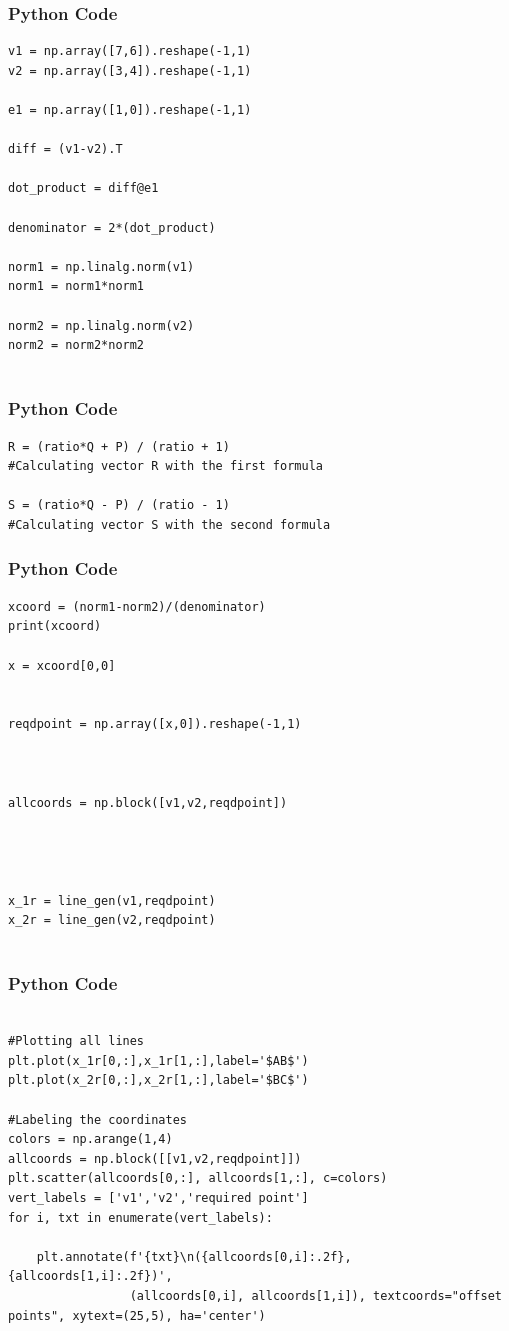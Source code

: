 \documentclass{beamer}
\begin{document}
\begin{frame}[fragile]
    \frametitle{Python Code}

    \begin{lstlisting}
v1 = np.array([7,6]).reshape(-1,1)
v2 = np.array([3,4]).reshape(-1,1)

e1 = np.array([1,0]).reshape(-1,1)

diff = (v1-v2).T

dot_product = diff@e1

denominator = 2*(dot_product)

norm1 = np.linalg.norm(v1)
norm1 = norm1*norm1

norm2 = np.linalg.norm(v2)
norm2 = norm2*norm2


    \end{lstlisting}
\end{frame}

\begin{frame}[fragile]
    \frametitle{Python Code}

    \begin{lstlisting}
R = (ratio*Q + P) / (ratio + 1)
#Calculating vector R with the first formula

S = (ratio*Q - P) / (ratio - 1)
#Calculating vector S with the second formula

    \end{lstlisting}
\end{frame}

\begin{frame}[fragile]
    \frametitle{Python Code}

    \begin{lstlisting}
xcoord = (norm1-norm2)/(denominator)
print(xcoord)

x = xcoord[0,0]


reqdpoint = np.array([x,0]).reshape(-1,1)



allcoords = np.block([v1,v2,reqdpoint])




x_1r = line_gen(v1,reqdpoint)
x_2r = line_gen(v2,reqdpoint)


\end{lstlisting}
\end{frame}

\begin{frame}[fragile]
    \frametitle{Python Code}

    \begin{lstlisting}

#Plotting all lines
plt.plot(x_1r[0,:],x_1r[1,:],label='$AB$')
plt.plot(x_2r[0,:],x_2r[1,:],label='$BC$')

#Labeling the coordinates
colors = np.arange(1,4)
allcoords = np.block([[v1,v2,reqdpoint]])
plt.scatter(allcoords[0,:], allcoords[1,:], c=colors)
vert_labels = ['v1','v2','required point']
for i, txt in enumerate(vert_labels):
    
    plt.annotate(f'{txt}\n({allcoords[0,i]:.2f}, {allcoords[1,i]:.2f})',
                 (allcoords[0,i], allcoords[1,i]), textcoords="offset points", xytext=(25,5), ha='center') 
\end{lstlisting}
\end{frame}
\end{document}

